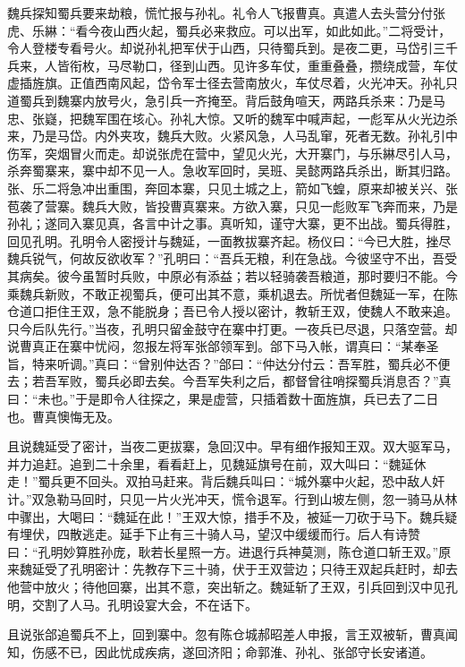 魏兵探知蜀兵要来劫粮，慌忙报与孙礼。礼令人飞报曹真。真遣人去头营分付张虎、乐綝：“看今夜山西火起，蜀兵必来救应。可以出军，如此如此。”二将受计，令人登楼专看号火。却说孙礼把军伏于山西，只待蜀兵到。是夜二更，马岱引三千兵来，人皆衔枚，马尽勒口，径到山西。见许多车仗，重重叠叠，攒绕成营，车仗虚插旌旗。正值西南风起，岱令军士径去营南放火，车仗尽着，火光冲天。孙礼只道蜀兵到魏寨内放号火，急引兵一齐掩至。背后鼓角喧天，两路兵杀来：乃是马忠、张嶷，把魏军围在垓心。孙礼大惊。又听的魏军中喊声起，一彪军从火光边杀来，乃是马岱。内外夹攻，魏兵大败。火紧风急，人马乱窜，死者无数。孙礼引中伤军，突烟冒火而走。却说张虎在营中，望见火光，大开寨门，与乐綝尽引人马，杀奔蜀寨来，寨中却不见一人。急收军回时，吴班、吴懿两路兵杀出，断其归路。张、乐二将急冲出重围，奔回本寨，只见土城之上，箭如飞蝗，原来却被关兴、张苞袭了营寨。魏兵大败，皆投曹真寨来。方欲入寨，只见一彪败军飞奔而来，乃是孙礼；遂同入寨见真，各言中计之事。真听知，谨守大寨，更不出战。蜀兵得胜，回见孔明。孔明令人密授计与魏延，一面教拔寨齐起。杨仪曰：“今已大胜，挫尽魏兵锐气，何故反欲收军？”孔明曰：“吾兵无粮，利在急战。今彼坚守不出，吾受其病矣。彼今虽暂时兵败，中原必有添益；若以轻骑袭吾粮道，那时要归不能。今乘魏兵新败，不敢正视蜀兵，便可出其不意，乘机退去。所忧者但魏延一军，在陈仓道口拒住王双，急不能脱身；吾已令人授以密计，教斩王双，使魏人不敢来追。只今后队先行。”当夜，孔明只留金鼓守在寨中打更。一夜兵已尽退，只落空营。却说曹真正在寨中忧闷，忽报左将军张郃领军到。郃下马入帐，谓真曰：“某奉圣旨，特来听调。”真曰：“曾别仲达否？”郃曰：“仲达分付云：吾军胜，蜀兵必不便去；若吾军败，蜀兵必即去矣。今吾军失利之后，都督曾往哨探蜀兵消息否？”真曰：“未也。”于是即令人往探之，果是虚营，只插着数十面旌旗，兵已去了二日也。曹真懊悔无及。

且说魏延受了密计，当夜二更拔寨，急回汉中。早有细作报知王双。双大驱军马，并力追赶。追到二十余里，看看赶上，见魏延旗号在前，双大叫曰：“魏延休走！”蜀兵更不回头。双拍马赶来。背后魏兵叫曰：“城外寨中火起，恐中敌人奸计。”双急勒马回时，只见一片火光冲天，慌令退军。行到山坡左侧，忽一骑马从林中骤出，大喝曰：“魏延在此！”王双大惊，措手不及，被延一刀砍于马下。魏兵疑有埋伏，四散逃走。延手下止有三十骑人马，望汉中缓缓而行。后人有诗赞曰：“孔明妙算胜孙庞，耿若长星照一方。进退行兵神莫测，陈仓道口斩王双。”原来魏延受了孔明密计：先教存下三十骑，伏于王双营边；只待王双起兵赶时，却去他营中放火；待他回寨，出其不意，突出斩之。魏延斩了王双，引兵回到汉中见孔明，交割了人马。孔明设宴大会，不在话下。

且说张郃追蜀兵不上，回到寨中。忽有陈仓城郝昭差人申报，言王双被斩，曹真闻知，伤感不已，因此忧成疾病，遂回济阳；命郭淮、孙礼、张郃守长安诸道。

